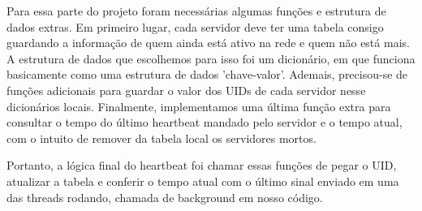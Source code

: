 Para essa parte do projeto foram necessárias algumas funções e estrutura de dados extras. Em primeiro lugar, cada servidor deve ter uma tabela consigo guardando a informação de quem ainda está ativo na rede e quem não está mais. A estrutura de dados que escolhemos para isso foi um dicionário, em que funciona basicamente como uma estrutura de dados 'chave-valor'. Ademais, precisou-se de funções adicionais para guardar o valor dos UIDs de cada servidor nesse dicionários locais. Finalmente, implementamos uma última função extra para consultar o tempo do último heartbeat mandado pelo servidor e o tempo atual, com o intuito de remover da tabela local os servidores mortos.

Portanto, a lógica final do heartbeat foi chamar essas funções de pegar o UID, atualizar a tabela e conferir o tempo atual com o último sinal enviado em uma das threads rodando, chamada de background em nosso código.









